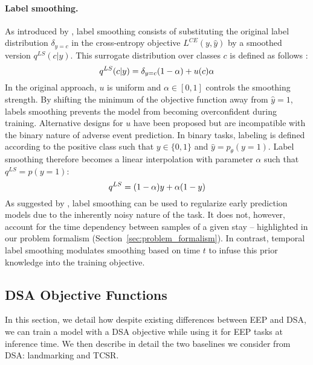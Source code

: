 \documentclass[nohyperref]{article}
\begin{document}
\paragraph{Label smoothing.} As introduced by \citet{DBLP:conf/cvpr/SzegedyVISW16}, label smoothing consists of substituting the original label distribution $\delta_{y = c}$ in the cross-entropy objective $L^{CE}(y,\hat{y})$ by a smoothed version $q^{LS}(c|y)$. This surrogate distribution over classes $c$ is defined as follows :
\begin{equation}
q^{LS}(c|y) = \delta_{y = c}(1-\alpha) + u(c) \alpha\\
\end{equation}
In the original approach, $u$ is uniform and $\alpha \in [0,1]$ controls the smoothing strength. By shifting the minimum of the objective function away from $\hat{y} = 1$, labels smoothing prevents the model from becoming overconfident during training. Alternative designs for $u$ have been proposed \citep{DBLP:conf/aistats/LiDB20,DBLP:conf/acl/MeisterSC20,DBLP:conf/aaai/LienenH21} but are incompatible with the binary nature of adverse event prediction. In binary tasks, labeling is defined according to the positive class such that $y \in \{0,1\}$ and $\hat{y} =  p_\theta(y = 1)$. Label smoothing therefore becomes a linear interpolation with parameter $\alpha$ such that $q^{LS} = p(y=1)$:
\begin{equation}
q^{LS} =(1-\alpha)y + \alpha(1-y)\\
\end{equation}
As suggested by \citet{DBLP:conf/icml/LukasikBMK20}, label smoothing can be used to regularize early prediction models due to the inherently noisy nature of the task. It does not, however, account for the time dependency between samples of a given stay -- highlighted in our problem formalism (Section~\ref{sec:problem_formalism}). In contrast, temporal label smoothing modulates smoothing based on time $t$ to infuse this prior knowledge into the training objective.


\subsection{DSA Objective Functions}

In this section, we detail how despite existing differences between EEP and DSA, we can train a model with a DSA objective while using it for EEP tasks at inference time. We then describe in detail the two baselines we consider from DSA: landmarking and TCSR.
\end{document}
